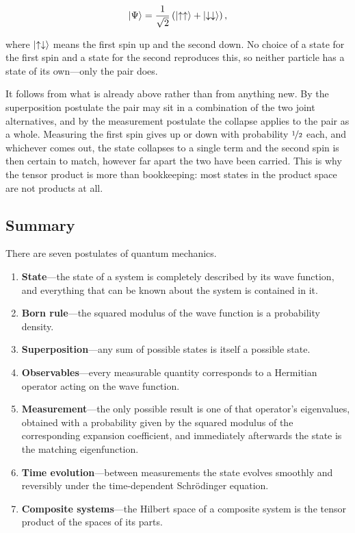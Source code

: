         \begin{equation*}
            \ket{\Psi} = \frac{1}{\sqrt{2}}\left(\ket{\uparrow\uparrow} + \ket{\downarrow\downarrow}\right),
        \end{equation*}

        where $\ket{\uparrow\downarrow}$ means the first spin up and the second down. No choice of a state for the first spin and a state for the second reproduces this, so neither particle has a state of its own---only the pair does.

        It follows from what is already above rather than from anything new. By the superposition postulate the pair may sit in a combination of the two joint alternatives, and by the measurement postulate the collapse applies to the pair as a whole. Measuring the first spin gives up or down with probability $\nicefrac{1}{2}$ each, and whichever comes out, the state collapses to a single term and the second spin is then certain to match, however far apart the two have been carried. This is why the tensor product is more than bookkeeping: most states in the product space are not products at all.

    \subsection{Summary}

        There are seven postulates of quantum mechanics.

        \begin{enumerate}
            \item \textbf{State}---the state of a system is completely described by its wave function, and everything that can be known about the system is contained in it.
            \item \textbf{Born rule}---the squared modulus of the wave function is a probability density.
            \item \textbf{Superposition}---any sum of possible states is itself a possible state.
            \item \textbf{Observables}---every measurable quantity corresponds to a Hermitian operator acting on the wave function.
            \item \textbf{Measurement}---the only possible result is one of that operator's eigenvalues, obtained with a probability given by the squared modulus of the corresponding expansion coefficient, and immediately afterwards the state is the matching eigenfunction.
            \item \textbf{Time evolution}---between measurements the state evolves smoothly and reversibly under the time-dependent Schrödinger equation.
            \item \textbf{Composite systems}---the Hilbert space of a composite system is the tensor product of the spaces of its parts.
        \end{enumerate}

